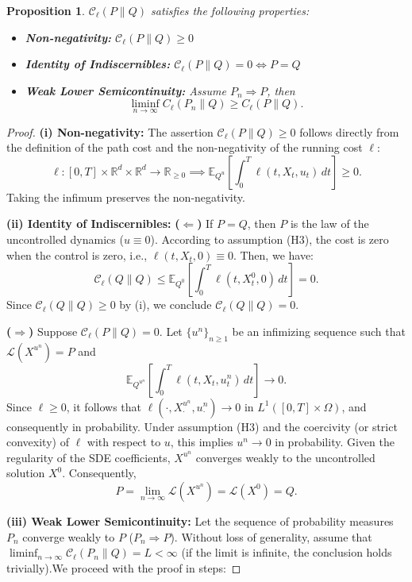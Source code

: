 \documentclass[11pt]{article}
\newtheorem{proposition}{Proposition}[section]
\begin{document}
\begin{proposition}
$\mathcal C_\ell(P\|Q)$ satisfies the following properties:
\begin{itemize}
\item[\bf (i)] \textbf{Non-negativity:} $\mathcal C_\ell(P\|Q) \ge 0$
\item[\bf (ii)] \textbf{Identity of Indiscernibles:} $\mathcal C_\ell(P\|Q) = 0 \iff P = Q$
\item[\bf (iii)] \textbf{Weak Lower Semicontinuity:} Assume $P_n \Rightarrow P$,
then $$\liminf_{n \to \infty} C_\ell(P_n\|Q) \ge C_\ell(P\|Q).$$
\end{itemize}
\end{proposition}
\begin{proof}
\textbf{(i) Non-negativity:}
The assertion $\mathcal C_\ell(P\|Q) \ge 0$ follows directly from the definition of the path cost and the non-negativity of the running cost $\ell$:
$$
\ell : [0,T] \times \mathbb{R}^d \times \mathbb{R}^d \to \mathbb{R}_{\ge 0} \implies \mathbb{E}_{Q^u}\left[\int_0^T\ell(t,X_t,u_t)\,dt\right] \ge 0.
$$
Taking the infimum preserves the non-negativity.



\textbf{(ii) Identity of Indiscernibles:}
\textbf{($\Leftarrow$)} If $P = Q$, then $P$ is the law of the uncontrolled dynamics ($u \equiv 0$). According to assumption ({H3}), the cost is zero when the control is zero, i.e., $\ell(t, X_t, 0) \equiv 0$. Then, we have:
$$
\mathcal C_\ell(Q\|Q) \le \mathbb{E}_{Q^0}\left[\int_0^T\ell(t,X_t^0,0)\,dt\right] = 0.
$$
Since $\mathcal C_\ell(Q\|Q) \ge 0$ by (i), we conclude $\mathcal C_\ell(Q\|Q) = 0$.

\textbf{($\Rightarrow$)} Suppose $\mathcal C_\ell(P\|Q) = 0$. Let $\{u^n\}_{n \ge 1}$ be an infimizing sequence such that $\mathcal L(X^{u^n}) = P$ and
$$
\mathbb{E}_{Q^{u^n}}\left[\int_0^T\ell(t,X_t,u^n_{t})\,dt\right] \to 0.
$$
Since $\ell \ge 0$, it follows that $\ell(\cdot, X^{u^n}_\cdot, u^n_\cdot) \to 0$ in $L^1([0, T]\times\Omega)$, and consequently in probability. Under assumption ({H3}) and the coercivity (or strict convexity) of $\ell$ with respect to $u$, this implies $u^n \to 0$ in probability. Given the regularity of the SDE coefficients, $X^{u^n}$ converges weakly to the uncontrolled solution $X^0$. Consequently,$$P = \lim_{n \to \infty} \mathcal L(X^{u^n}) = \mathcal L(X^0) = Q.$$



\textbf{(iii) Weak Lower Semicontinuity:}
Let the sequence of probability measures $P_n$ converge weakly to $P$ ($P_n \Rightarrow P$). Without loss of generality, assume that $\liminf_{n \to \infty} \mathcal C_\ell(P_n\|Q) = L < \infty$ (if the limit is infinite, the conclusion holds trivially).We proceed with the proof in steps:


\end{proof}
\end{document}
